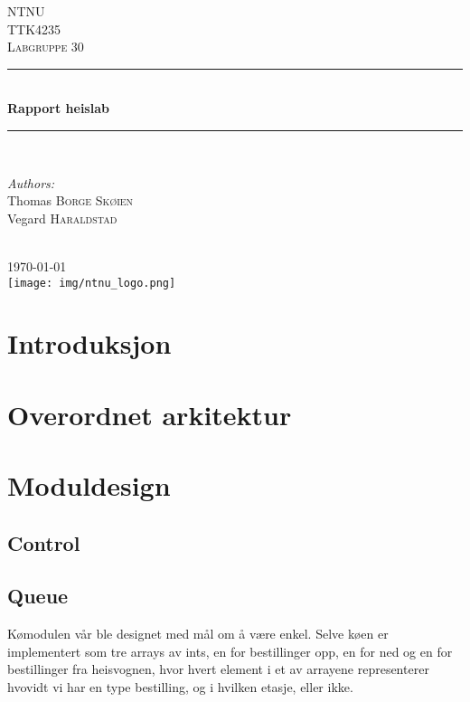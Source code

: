 \documentclass{article}
\begin{document}
\newcommand{\HRule}{\rule{\linewidth}{0.5mm}}

\begin{center}

\textsc{\LARGE NTNU}\\[1.5cm] 
\textsc{\Large TTK4235}\\[0.5cm]
\textsc{\large Labgruppe 30}\\[0.5cm]

\HRule \\[0.4cm]
{ \huge \bfseries Rapport heislab}\\[0.4cm]
\HRule \\[1.5cm]
 
\begin{minipage}{0.6\textwidth}
\begin{flushleft} \large
\emph{Authors:}\\
Thomas \textsc{Borge Skøien} \\Vegard \textsc{Haraldstad} \\
\end{flushleft}
\end{minipage}
~
\\[2cm]

{\large \today}\\[2cm] 

\texttt{[image: img/ntnu\_logo.png]}

\end{center}
\newpage
\cfoot{\normalsize\thepage}

\section*{Introduksjon}

\tableofcontents

\newpage
\nocite{*}
\cfoot{\normalsize\thepage~}
\section{Overordnet arkitektur}
\section{Moduldesign}
\subsection{Control}
\subsection{Queue}  
Kømodulen vår ble designet med mål om å være enkel. Selve køen er implementert som tre arrays av ints, en for bestillinger opp, en for ned og en for bestillinger fra heisvognen, hvor hvert element i et av arrayene representerer hvovidt vi har en type bestilling, og i hvilken etasje, eller ikke. 
\end{document}
